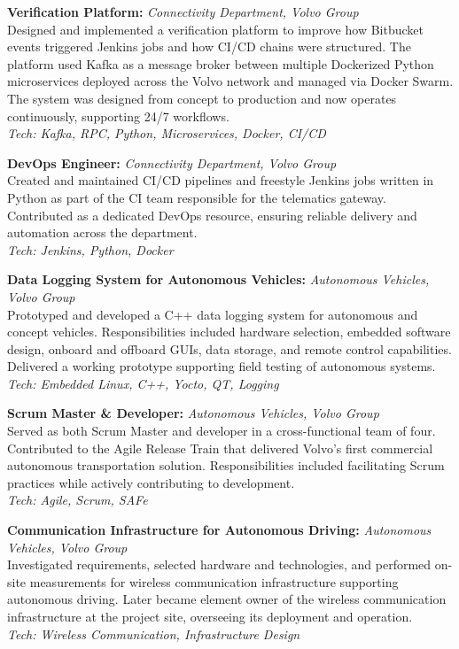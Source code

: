 
\SmallSep
\textbf{Verification Platform:} \textit{Connectivity Department, Volvo Group} \\
Designed and implemented a verification platform to improve how Bitbucket events triggered Jenkins jobs and how CI/CD chains were structured. The platform used Kafka as a message broker between multiple Dockerized Python microservices deployed across the Volvo network and managed via Docker Swarm. The system was designed from concept to production and now operates continuously, supporting 24/7 workflows. \\
\textit{Tech: Kafka, RPC, Python, Microservices, Docker, CI/CD} \\
\SmallSep

\textbf{DevOps Engineer:} \textit{Connectivity Department, Volvo Group} \\
Created and maintained CI/CD pipelines and freestyle Jenkins jobs written in Python as part of the CI team responsible for the telematics gateway. Contributed as a dedicated DevOps resource, ensuring reliable delivery and automation across the department. \\
\textit{Tech: Jenkins, Python, Docker} \\
\SmallSep

\textbf{Data Logging System for Autonomous Vehicles:} \textit{Autonomous Vehicles, Volvo Group} \\
Prototyped and developed a C++ data logging system for autonomous and concept vehicles. Responsibilities included hardware selection, embedded software design, onboard and offboard GUIs, data storage, and remote control capabilities. Delivered a working prototype supporting field testing of autonomous systems. \\
\textit{Tech: Embedded Linux, C++, Yocto, QT, Logging} \\
\SmallSep

\textbf{Scrum Master \& Developer:} \textit{Autonomous Vehicles, Volvo Group} \\
Served as both Scrum Master and developer in a cross-functional team of four. Contributed to the Agile Release Train that delivered Volvo’s first commercial autonomous transportation solution. Responsibilities included facilitating Scrum practices while actively contributing to development. \\
\textit{Tech: Agile, Scrum, SAFe} \\
\SmallSep

\textbf{Communication Infrastructure for Autonomous Driving:} \textit{Autonomous Vehicles, Volvo Group} \\
Investigated requirements, selected hardware and technologies, and performed on-site measurements for wireless communication infrastructure supporting autonomous driving. Later became element owner of the wireless communication infrastructure at the project site, overseeing its deployment and operation. \\
\textit{Tech: Wireless Communication, Infrastructure Design} \\
\SmallSep

